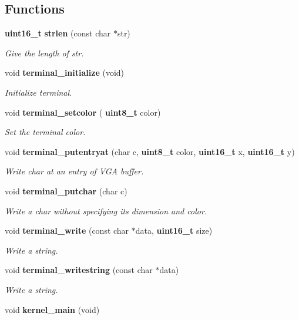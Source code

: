\subsection*{Functions}
\begin{DoxyCompactItemize}
\item 
\mbox{\label{kernel_8c_ab8ff83f1c6edb3ab0e2119686167dcef}} 
\textbf{ uint16\+\_\+t} \textbf{ strlen} (const char $\ast$str)
\begin{DoxyCompactList}\small\item\em Give the length of str. \end{DoxyCompactList}\item 
void \textbf{ terminal\+\_\+initialize} (void)
\begin{DoxyCompactList}\small\item\em Initialize terminal. \end{DoxyCompactList}\item 
void \textbf{ terminal\+\_\+setcolor} (\textbf{ uint8\+\_\+t} color)
\begin{DoxyCompactList}\small\item\em Set the terminal color. \end{DoxyCompactList}\item 
void \textbf{ terminal\+\_\+putentryat} (char c, \textbf{ uint8\+\_\+t} color, \textbf{ uint16\+\_\+t} x, \textbf{ uint16\+\_\+t} y)
\begin{DoxyCompactList}\small\item\em Write char at an entry of V\+GA buffer. \end{DoxyCompactList}\item 
void \textbf{ terminal\+\_\+putchar} (char c)
\begin{DoxyCompactList}\small\item\em Write a char without specifying its dimension and color. \end{DoxyCompactList}\item 
void \textbf{ terminal\+\_\+write} (const char $\ast$data, \textbf{ uint16\+\_\+t} size)
\begin{DoxyCompactList}\small\item\em Write a string. \end{DoxyCompactList}\item 
\mbox{\label{kernel_8c_a09ed5506d8ae907e2c8e0c96f6d1a928}} 
void \textbf{ terminal\+\_\+writestring} (const char $\ast$data)
\begin{DoxyCompactList}\small\item\em Write a string. \end{DoxyCompactList}\item 
\mbox{\label{kernel_8c_a6b8fb674fb359f6ae53dc9c4fb7fc6be}} 
void {\bfseries kernel\+\_\+main} (void)
\end{DoxyCompactItemize}
